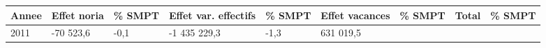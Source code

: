\begin{longtable}[]{@{}lllllllll@{}}
\toprule
\begin{minipage}[b]{0.05\columnwidth}\raggedright
Annee\strut
\end{minipage} & \begin{minipage}[b]{0.10\columnwidth}\raggedright
Effet noria\strut
\end{minipage} & \begin{minipage}[b]{0.06\columnwidth}\raggedright
\% SMPT\strut
\end{minipage} & \begin{minipage}[b]{0.16\columnwidth}\raggedright
Effet var. effectifs\strut
\end{minipage} & \begin{minipage}[b]{0.06\columnwidth}\raggedright
\% SMPT\strut
\end{minipage} & \begin{minipage}[b]{0.12\columnwidth}\raggedright
Effet vacances\strut
\end{minipage} & \begin{minipage}[b]{0.06\columnwidth}\raggedright
\% SMPT\strut
\end{minipage} & \begin{minipage}[b]{0.10\columnwidth}\raggedright
Total\strut
\end{minipage} & \begin{minipage}[b]{0.06\columnwidth}\raggedright
\% SMPT\strut
\end{minipage}\tabularnewline
\midrule
\endhead
\begin{minipage}[t]{0.05\columnwidth}\raggedright
2011\strut
\end{minipage} & \begin{minipage}[t]{0.10\columnwidth}\raggedright
-70 523,6\strut
\end{minipage} & \begin{minipage}[t]{0.06\columnwidth}\raggedright
-0,1\strut
\end{minipage} & \begin{minipage}[t]{0.16\columnwidth}\raggedright
-1 435 229,3\strut
\end{minipage} & \begin{minipage}[t]{0.06\columnwidth}\raggedright
-1,3\strut
\end{minipage} & \begin{minipage}[t]{0.12\columnwidth}\raggedright
631 019,5\strut
\end{minipage} & \begin{minipage}[t]{0.06\columnwidth}\raggedright

\end{minipage}
\end{longtable}
